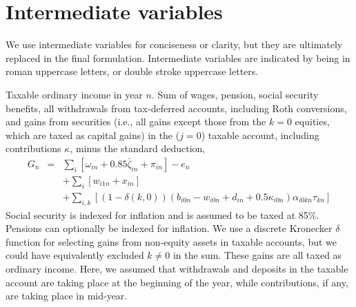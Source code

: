 \documentclass{report}[fleqn,11pt]
\begin{document}
\section{Intermediate variables}
We use intermediate variables for conciseness or clarity,
but they are ultimately replaced in the final formulation.
Intermediate variables are indicated by being in roman uppercase letters, or double stroke uppercase letters.
\begin{description}[leftmargin=4em,style=multiline]
\item [$G_n$]
	Taxable ordinary income in year $n$. Sum of wages, pension, social security benefits, all withdrawals
	from tax-deferred accounts, including Roth conversions, and gains from securities
	(i.e., all gains except those from the $k=0$ equities, which are taxed as capital gains)
	in the ($j=0$) taxable account, including contributions $\kappa$, minus the standard deduction,
	\begin{eqnarray}
		\label{Eq:Tx2}
		G_n &=& 
		\sum_i [\omega_{in} + 0.85\bar\zeta_{in} + \pi_{in}]
		- e_n
		\nonumber \\
		&& + \sum_i [w_{i1n} + x_{in}]
		\nonumber \\
		&& + \sum_{i,k} 
		[(1-\delta(k, 0))(b_{i0n} - w_{i0n} + d_{in} + 0.5\kappa_{i0n})\alpha_{i0kn}\tau_{kn}]
	\end{eqnarray}
	Social security is indexed for inflation and is assumed to be taxed at 85\%.
	Pensions can optionally be indexed for inflation.
	We use a discrete Kronecker $\delta$ function for selecting gains from non-equity assets in
	taxable accounts, but we could have equivalently excluded $k \neq 0$ in the sum.
	These gains are all taxed as ordinary income. Here, we assumed that
	withdrawals and deposits in the taxable account are taking place at the beginning of the year, while
	contributions, if any, are taking place in mid-year.


\end{description}
\end{document}
